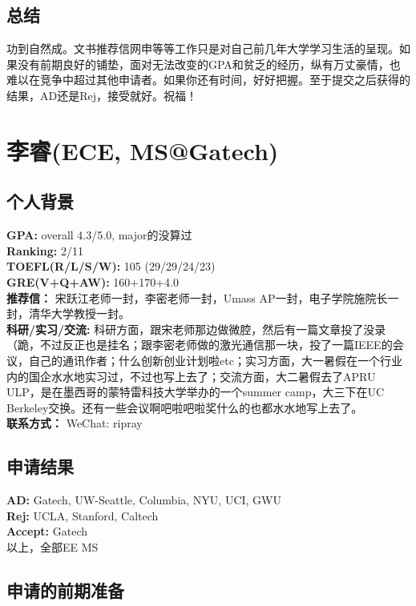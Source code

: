 \documentclass[a4paper,UTF8]{book}
\begin{document}
    \subsection*{总结}
        功到自然成。文书推荐信网申等等工作只是对自己前几年大学学习生活的呈现。如果没有前期良好的铺垫，面对无法改变的GPA和贫乏的经历，纵有万丈豪情，也难以在竞争中超过其他申请者。如果你还有时间，好好把握。至于提交之后获得的结果，AD还是Rej，接受就好。祝福！

\clearpage
\section{李睿(ECE, MS@Gatech)}
    \subsection*{个人背景}
        \textbf{GPA:} overall 4.3/5.0, major的没算过\\
        \textbf{Ranking:} 2/11\\
        \textbf{TOEFL(R/L/S/W): } 105 (29/29/24/23)\\
        \textbf{GRE(V+Q+AW):} 160+170+4.0\\
        \textbf{推荐信：} 宋跃江老师一封，李密老师一封，Umass AP一封，电子学院施院长一封，清华大学教授一封。\\
        \textbf{科研/实习/交流:} 科研方面，跟宋老师那边做微腔，然后有一篇文章投了没录（跪，不过反正也是挂名；跟李密老师做的激光通信那一块，投了一篇IEEE的会议，自己的通讯作者；什么创新创业计划啦etc；实习方面，大一暑假在一个行业内的国企水水地实习过，不过也写上去了；交流方面，大二暑假去了APRU ULP，是在墨西哥的蒙特雷科技大学举办的一个summer camp，大三下在UC Berkeley交换。还有一些会议啊吧啦吧啦奖什么的也都水水地写上去了。\\ 
        \textbf{联系方式：} WeChat: ripray

    \subsection*{申请结果}
        \textbf{AD:} Gatech, UW-Seattle, Columbia, NYU, UCI, GWU\\
        \textbf{Rej:} UCLA, Stanford, Caltech\\
        \textbf{Accept:} Gatech\\
        以上，全部EE MS

    \subsection*{申请的前期准备}
\end{document}
